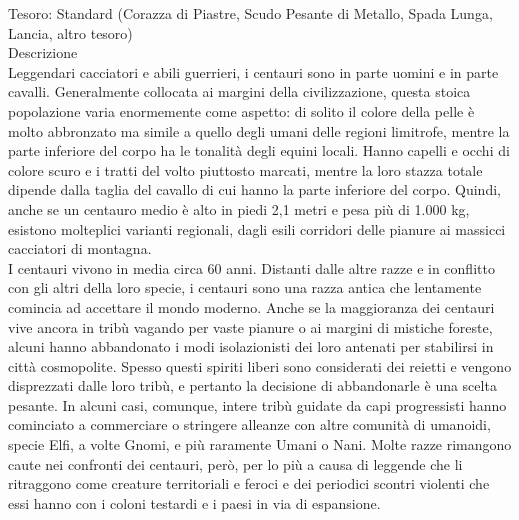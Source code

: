 \begin{multicols}{2}
Tesoro: Standard (Corazza di Piastre, Scudo Pesante di Metallo, Spada Lunga, Lancia, altro tesoro)\\
Descrizione\\
Leggendari cacciatori e abili guerrieri, i centauri sono in parte uomini e in parte cavalli. Generalmente collocata ai margini della civilizzazione, questa stoica popolazione varia enormemente come aspetto: di solito il colore della pelle è molto abbronzato ma simile a quello degli umani delle regioni limitrofe, mentre la parte inferiore del corpo ha le tonalità degli equini locali. Hanno capelli e occhi di colore scuro e i tratti del volto piuttosto marcati, mentre la loro stazza totale dipende dalla taglia del cavallo di cui hanno la parte inferiore del corpo. Quindi, anche se un centauro medio è alto in piedi 2,1 metri e pesa più di 1.000 kg, esistono molteplici varianti regionali, dagli esili corridori delle pianure ai massicci cacciatori di montagna.\\
I centauri vivono in media circa 60 anni. Distanti dalle altre razze e in conflitto con gli altri della loro specie, i centauri sono una razza antica che lentamente comincia ad accettare il mondo moderno. Anche se la maggioranza dei centauri vive ancora in tribù vagando per vaste pianure o ai margini di mistiche foreste, alcuni hanno abbandonato i modi isolazionisti dei loro antenati per stabilirsi in città cosmopolite. Spesso questi spiriti liberi sono considerati dei reietti e vengono disprezzati dalle loro tribù, e pertanto la decisione di abbandonarle è una scelta pesante. In alcuni casi, comunque, intere tribù guidate da capi progressisti hanno cominciato a commerciare o stringere alleanze con altre comunità di umanoidi, specie Elfi, a volte Gnomi, e più raramente Umani o Nani. Molte razze rimangono caute nei confronti dei centauri, però, per lo più a causa di leggende che li ritraggono come creature territoriali e feroci e dei periodici scontri violenti che essi hanno con i coloni testardi e i paesi in via di espansione.\\


\end{multicols}
